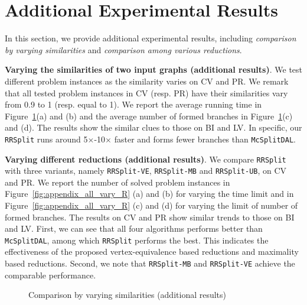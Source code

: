 \appendix
\section{Additional Experimental Results}
{\Yui
In this section, we provide additional experimental results, including \emph{comparison by varying similarities} and \emph{comparison among various reductions}.

\smallskip
\noindent\textbf{Varying the similarities of two input graphs (additional results)}. We test different problem instances as the similarity varies on \textsf{CV} and \textsf{PR}. We remark that all tested problem instances in \textsf{CV} (resp. \textsf{PR}) have their similarities vary from 0.9 to 1 (resp. equal to 1). We report the average running time in Figure~\ref{fig:appendix_all_vary_S}(a) and (b) and the average number of formed branches in Figure~\ref{fig:appendix_all_vary_S}(c) and (d). The results show the similar clues to those on \textsf{BI} and \textsf{LV}. In specific, our \texttt{RRSplit} runs around 5$\times$-10$\times$ faster and forms fewer branches than \texttt{McSplitDAL}.

\smallskip
\noindent\textbf{Varying different reductions (additional results)}. We compare \texttt{RRSplit} with three variants, namely \texttt{RRSplit-VE}, \texttt{RRSplit-MB} and \texttt{RRSplit-UB}, on \textsf{CV} and \textsf{PR}. We report the number of solved problem instances in Figure~\ref{fig:appendix_all_vary_R} (a) and (b) for varying the time limit and in Figure~\ref{fig:appendix_all_vary_R} (c) and (d) for varying the limit of number of formed branches. The results on \textsf{CV} and \textsf{PR} show similar trends to those on \textsf{BI} and \textsf{LV}. First, we can see that all four algorithms performs better than \texttt{McSplitDAL}, among which \texttt{RRSplit} performs the best. This indicates the effectiveness of the proposed vertex-equivalence based reductions and maximality based reductions. Second, we note that \texttt{RRSplit-MB} and \texttt{RRSplit-VE} achieve the comparable performance. 
}
\begin{figure}[]
	\caption{Comparison by varying similarities (additional results)}
	\label{fig:appendix_all_vary_S}
\end{figure}

